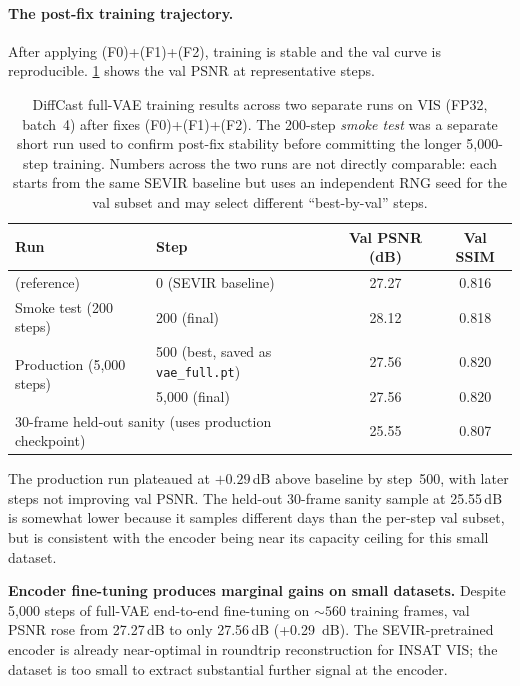 \documentclass[11pt,a4paper]{article}
\begin{document}
\paragraph{The post-fix training trajectory.}  After applying (F0)+(F1)+(F2),
training is stable and the val curve is reproducible.
\cref{tab:vae-trajectory} shows the val PSNR at representative steps.

\begin{table}[h]
\centering\small
\caption{DiffCast full-VAE training results across two separate runs on
VIS (FP32, batch~4) after fixes (F0)+(F1)+(F2). The 200-step \emph{smoke
test} was a separate short run used to confirm post-fix stability before
committing the longer 5{,}000-step training. Numbers across the two runs
are not directly comparable: each starts from the same SEVIR baseline but
uses an independent RNG seed for the val subset and may select different
``best-by-val'' steps.}
\label{tab:vae-trajectory}
\begin{tabular}{llcc}
\toprule
Run                          & Step                                       & Val PSNR (dB) & Val SSIM \\
\midrule
(reference)                  & 0 (SEVIR baseline)                          & 27.27         & 0.816    \\
\midrule
Smoke test (200 steps)       & 200 (final)                                & 28.12         & 0.818    \\
\midrule
\multirow{2}{*}{Production (5{,}000 steps)}
                             & 500 (best, saved as \texttt{vae\_full.pt}) & 27.56         & 0.820    \\
                             & 5{,}000 (final)                            & 27.56         & 0.820    \\
\midrule
\multicolumn{2}{l}{30-frame held-out sanity (uses production checkpoint)} & 25.55         & 0.807    \\
\bottomrule
\end{tabular}
\end{table}

The production run plateaued at $+0.29$\,dB above baseline by step~500,
with later steps not improving val PSNR. The held-out 30-frame sanity
sample at 25.55\,dB is somewhat lower because it samples different days
than the per-step val subset, but is consistent with the encoder being
near its capacity ceiling for this small dataset.

\begin{negfind}
\textbf{Encoder fine-tuning produces marginal gains on small datasets.}
Despite 5{,}000 steps of full-VAE end-to-end fine-tuning on $\sim 560$
training frames, val PSNR rose from 27.27\,dB to only 27.56\,dB (+0.29~dB).
The {SEVIR}-pretrained encoder is already near-optimal in roundtrip
reconstruction for INSAT VIS; the dataset is too small to extract
substantial further signal at the encoder.
\end{negfind}
\end{document}
